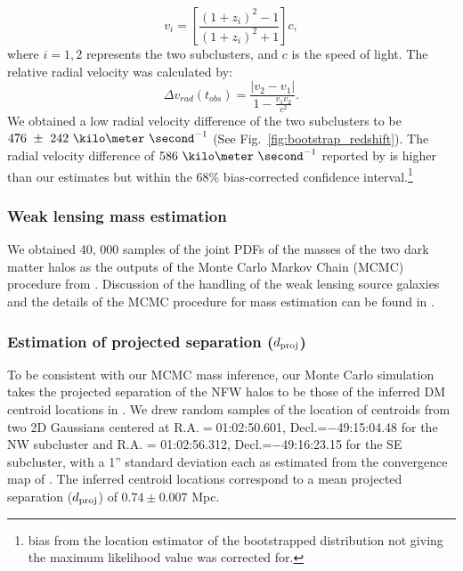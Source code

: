 \documentclass[letterpaper,useAMS,usenatbib]{mn2e}
\begin{document}
\begin{equation}
	v_i = \left[ \frac{(1+z_i)^2 - 1 }{(1+z_i)^2 + 1 }\right]c,
\end{equation}
where $i=1, 2$ represents the two subclusters, and $c$ is the speed of
light. The relative radial velocity was calculated by: 
\begin{equation}
	\Delta v_{rad}(t_{obs}) = \frac{|v_2 - v_1|}{1-\frac{v_1 v_2}{c^2}}.
\end{equation}
We obtained a low radial velocity difference of the two subclusters to be
$476~\pm~242~\kilo\meter~\second^{-1}$ (See Fig.~\ref{fig:bootstrap_redshift}). 
The radial velocity difference of $586~\kilo \meter~\second^{-1}$ reported by  
is higher than our estimates but within the 68\% bias-corrected
confidence interval.\footnote{bias from the location estimator of
	the bootstrapped distribution not giving the maximum likelihood value was
corrected for.} 
\subsubsection{Weak lensing mass estimation} 
We obtained 40, 000 samples of the joint PDFs of the masses of the two dark
matter halos as the outputs of the Monte Carlo Markov Chain (MCMC)
procedure from \citealt{Jee13}. Discussion of the handling of the weak
lensing source galaxies and the details of the MCMC procedure for mass
estimation can be found in \citealt{Jee13}. 
\subsubsection{Estimation of projected separation ($d_{\rm proj}$)} 
To be consistent with our MCMC mass inference, our Monte Carlo simulation takes 
the projected separation of the NFW halos to be those of the inferred
DM centroid locations in \citealt{Jee13}. We drew random samples
 of the location of centroids from two 2D Gaussians centered at
 R.A.$=$01:02:50.601, Decl.=$-$49:15:04.48 for the NW subcluster and R.A. =
 01:02:56.312, Decl.=$-$49:16:23.15 for the SE
subcluster, with a 1'' standard deviation each as estimated from the
convergence map of \citet{Jee13}. The
inferred centroid locations correspond to a mean projected separation
($d_{\rm proj}$) of $0.74\pm {0.007}$ Mpc.  
\end{document}

